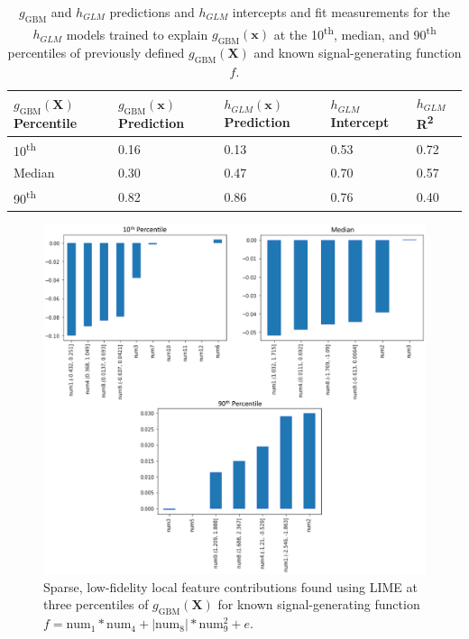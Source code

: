 \documentclass[11pt]{asaproc}
\begin{document}
\begin{table}[ht]
	\centering
	\caption{$g_{\text{GBM}}$ and $h_{GLM}$ predictions and $h_{GLM}$ intercepts and fit measurements for the $h_{GLM}$ models trained to explain $g_{\text{GBM}}(\mathbf{x})$ at the 10\textsuperscript{th}, median, and 90\textsuperscript{th} percentiles of previously defined $g_{\text{GBM}}(\mathbf{X})$ and known signal-generating function $f$.} 
	\begin{tabular}{ | p{1.7cm} | p{1.7cm} | p{1.7cm} | p{1.5cm}| p{1cm} | }
	\hline
	$g_{\text{GBM}}(\mathbf{X})$ Percentile & $g_{\text{GBM}}(\mathbf{x})$ Prediction & $h_{GLM}(\mathbf{x})$ Prediction & $h_{GLM}$ Intercept & $h_{GLM}$ R\textsuperscript{2} \\ 
	\hline
	10\textsuperscript{th} & 0.16 & 0.13 & 0.53 & 0.72\\
	\hline	
	Median & 0.30 & 0.47 & 0.70 & 0.57\\
	\hline	
	90\textsuperscript{th} & 0.82 & 0.86 & 0.76 & 0.40\\
	\hline
	\end{tabular}
	\label{tab:lime}
\end{table}	

\begin{figure}[htb]
	\begin{center}
		\includegraphics[scale=0.6]{img/figure_5.eps}
		\caption{Sparse, low-fidelity local feature contributions found using LIME at three percentiles of $g_{\text{GBM}}(\mathbf{X})$ for known signal-generating function $f = \text{num} _1 * \text{num}_4 + |\text{num}_8| * \text{num}_9^2 + e$.}
		\label{fig:lime}
	\end{center}
\end{figure}
\end{document}
